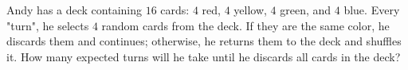 Andy has a deck containing $16$ cards: $4$ red, $4$ yellow, $4$ green, and $4$ blue. Every "turn", he selects $4$ random cards from the deck. If they are the same color, he discards them and continues; otherwise, he returns them to the deck and shuffles it. How many expected turns will he take until he discards all cards in the deck?
